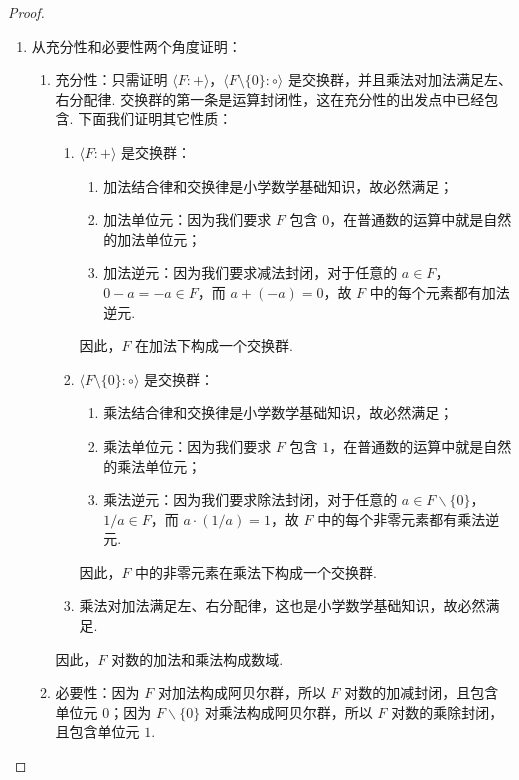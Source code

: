 \begin{proof}
\begin{enumerate}
    \item 从充分性和必要性两个角度证明：
    \begin{enumerate}
        \item 充分性：只需证明 $\langle F\colon+\rangle$，$\langle F\setminus\{0\}\colon\circ\rangle$ 是交换群，并且乘法对加法满足左、右分配律. 交换群的第一条是运算封闭性，这在充分性的出发点中已经包含. 下面我们证明其它性质：
        \begin{enumerate}
            \item $\langle F\colon+\rangle$ 是交换群：
            \begin{enumerate}
                \item 加法结合律和交换律是小学数学基础知识，故必然满足；
                \item 加法单位元：因为我们要求 $F$ 包含 $0$，在普通数的运算中就是自然的加法单位元；
                \item 加法逆元：因为我们要求减法封闭，对于任意的 $a \in F$，$0 - a = -a \in F$，而 $a + (-a) = 0$，故 $F$ 中的每个元素都有加法逆元.
            \end{enumerate}
            因此，$F$ 在加法下构成一个交换群.
            \item $\langle F\setminus\{0\}\colon\circ\rangle$ 是交换群：
            \begin{enumerate}
                \item 乘法结合律和交换律是小学数学基础知识，故必然满足；
                \item 乘法单位元：因为我们要求 $F$ 包含 $1$，在普通数的运算中就是自然的乘法单位元；
                \item 乘法逆元：因为我们要求除法封闭，对于任意的 $a \in F \backslash \{0\}$，$1/a \in F$，而 $a \cdot (1/a) = 1$，故 $F$ 中的每个非零元素都有乘法逆元.
            \end{enumerate}
            因此，$F$ 中的非零元素在乘法下构成一个交换群.
            \item 乘法对加法满足左、右分配律，这也是小学数学基础知识，故必然满足.
        \end{enumerate}
        因此，$F$ 对数的加法和乘法构成数域.

        \item 必要性：因为 $F$ 对加法构成阿贝尔群，所以 $F$ 对数的加减封闭，且包含单位元 $0$；因为 $F \backslash \{0\}$ 对乘法构成阿贝尔群，所以 $F$ 对数的乘除封闭，且包含单位元 $1$.
    \end{enumerate}


\end{enumerate}
\end{proof}
